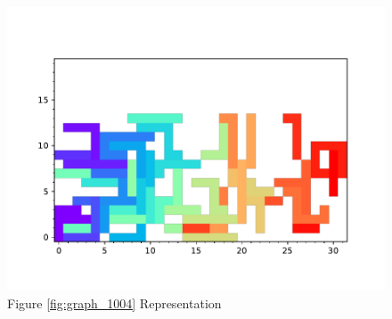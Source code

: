 \documentclass{standalone}
\begin{document}
\begin{figure}[!htb]
	\caption{Figure \ref{fig:graph_1004} Representation}
	\label{fig:picture_1004}
	\includegraphics[width=\textwidth]{../graphs/picture/1004.pdf}
\end{figure}
\end{document}
